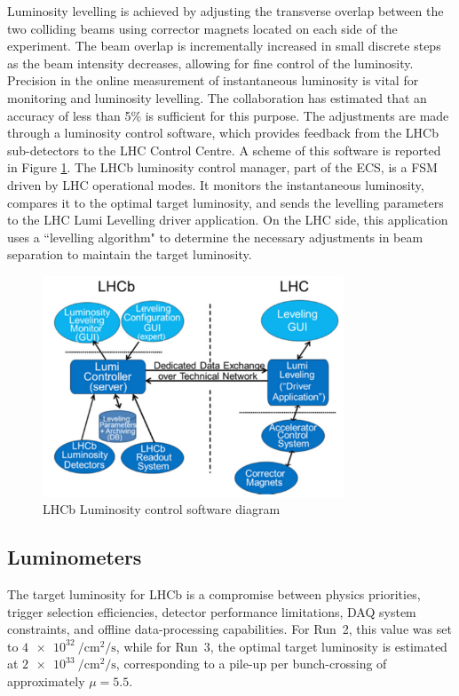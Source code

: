 Luminosity levelling is achieved by adjusting the transverse overlap between the two colliding beams using corrector magnets located on each side of the experiment. The beam overlap is incrementally increased in small discrete steps as the beam intensity decreases, allowing for fine control of the luminosity. Precision in the online measurement of instantaneous luminosity is vital for monitoring and luminosity levelling. The collaboration has estimated that an accuracy of less than 5\% is sufficient for this purpose. 
 The adjustments are made through a luminosity control software, which provides feedback from the LHCb sub-detectors to the LHC Control Centre. A scheme of this software is reported in Figure \ref{fig:lumi-control}.
The LHCb luminosity control manager, part of the ECS, is a FSM driven by LHC operational modes. It monitors the instantaneous luminosity, compares it to the optimal target luminosity, and sends the levelling parameters to the LHC Lumi Levelling driver application. On the LHC side, this application uses a ``levelling algorithm" to determine the necessary adjustments in beam separation to maintain the target luminosity.

\begin{figure}
    \centering
    \includegraphics[width=0.8\textwidth]{figures/lumi_control.png}
    \caption{LHCb Luminosity control software diagram}
    \label{fig:lumi-control}
\end{figure}

\subsection{Luminometers}
The target luminosity for LHCb is a compromise between physics priorities, trigger selection efficiencies, detector performance limitations, DAQ system constraints, and offline data-processing capabilities. For Run~2, this value was set to $\SI{4e32}{\per\centi\meter\squared\per\second}$, while for Run~3, the optimal target luminosity is estimated at $\SI{2e33}{\per\centi\meter\squared\per\second}$, corresponding to a pile-up per bunch-crossing of approximately $\mu = 5.5$.

